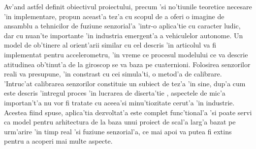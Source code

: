 \documentclass[12pt,a4paper,twoside]{report}
\begin{document}
Av'and astfel definit obiectivul proiectului, precum 'si no'tiunile teoretice necesare 'in implementare, propun aceast'a tez'a cu scopul de a oferi o imagine de ansamblu a tehnicilor de fuziune senzorial'a 'intr-o aplica'tie cu caracter ludic, dar cu nuan'te importante 'in industria emergent'a a vehiculelor autonome. Un model de ob'tinere al orient'arii similar cu cel descris 'in articolul \cite{10.1007/978-3-319-06773-5_41} va fi implementat pentru accelerometru, 'in vreme ce procesul modelului ce va descrie atitudinea ob'tinut'a de la giroscop se va baza pe cuaternioni. Folosirea senzorilor reali va presupune, 'in constrast cu cei simula'ti, o metod'a de calibrare. 'Intruc'at calibrarea senzorilor constituie un subiect de tez'a 'in sine, dup'a cum este descris 'intregul proces 'in lucrarea de diserta'tie \cite{RoyoSerrano1537570}, aspectele de mic'a importan't'a nu vor fi tratate cu aceea'si minu'tiozitate cerut'a 'in industrie. Acestea fiind spuse, aplica'tia dezvoltat'a este complet func'tional'a 'si poate servi ca model pentru arhitectura de la baza unui proiect de scal'a larg'a bazat pe urm'arire 'in timp real 'si fuziune senzorial'a, ce mai apoi va putea fi extins pentru a acoperi mai multe aspecte.









\end{document}
